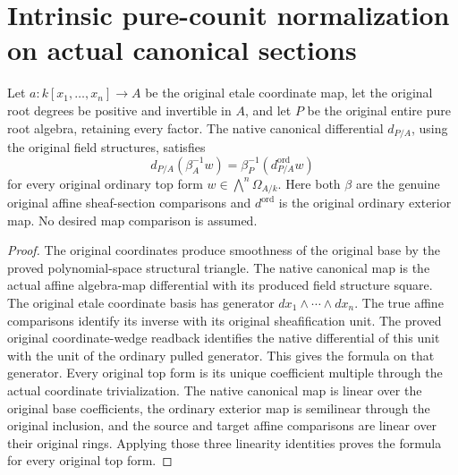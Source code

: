 \section{Intrinsic pure-counit normalization on actual canonical sections}

\begin{lemma}
\label{lem:kn-global-trace-native-pure-topforms}
\leanok
Let $a:k[x_1,\ldots,x_n]\to A$ be the original etale coordinate map,
let the original root degrees be positive and invertible in $A$, and
let $P$ be the original entire pure root algebra, retaining every factor.
The native canonical differential $d_{P/A}$, using the original field
structures, satisfies
\[
 d_{P/A}(\beta_A^{-1}w)=\beta_P^{-1}(d_{P/A}^{\mathrm{ord}}w)
\]
for every original ordinary top form $w\in\bigwedge^n\Omega_{A/k}$.
Here both $\beta$ are the genuine original affine sheaf-section
comparisons and $d^{\mathrm{ord}}$ is the original ordinary exterior map.
No desired map comparison is assumed.
\end{lemma}
\begin{proof}
The original coordinates produce smoothness of the original base by the
proved polynomial-space structural triangle.  The native canonical
map is the actual affine algebra-map differential with its produced field
structure square.  The original etale coordinate basis has generator
$dx_1\wedge\cdots\wedge dx_n$.  The true affine comparisons identify its
inverse with its original sheafification unit.  The proved original
coordinate-wedge readback identifies the native differential of this
unit with the unit of the ordinary pulled generator.  This gives the
formula on that generator.  Every original top form is its unique
coefficient multiple through the actual coordinate trivialization.
The native canonical map is linear over the original base coefficients,
the ordinary exterior map is semilinear through the original inclusion,
and the source and target affine comparisons are linear over their
original rings.  Applying those three linearity identities proves the
formula for every original top form.
\end{proof}

